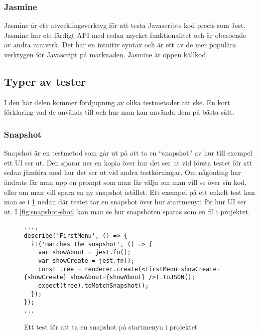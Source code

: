 \subsubsection{Jasmine}
Jasmine är ett utvecklingsverktyg för att testa Javascripts kod precis som Jest. Jasmine har ett färdigt API med redan mycket funktionalitet och är oberoende av andra ramverk. Det har en intuitiv syntax och är ett av de mer populära verktygen för Javascript på marknaden. Jasmine är öppen källkod.

\subsection{Typer av tester}
I den här delen kommer fördjupning av olika testmetoder att ske. En kort förklaring vad de används till och hur man kan använda dem på bästa sätt.

\subsubsection{Snapshot}
Snapshot är en testmetod som går ut på att ta en ``snapshot'' av hur till exempel ett UI ser ut. Den sparar ner en kopia över hur det ser ut vid första testet för att sedan jämföra med hur det ser ut vid andra testkörningar. Om någonting har ändrats får man upp en prompt som man får välja om man vill se över sin kod, eller om man vill spara en ny snapshot istället. Ett exempel på ett enkelt test kan man se i \ref{fig:snapshot-test} nedan där testet tar en snapshot över hur startmenyn för hur UI ser ut. I \ref{fig:snapshot-shot} kan man se hur snapshoten sparas som en fil i projektet.

\lstset{language=JavaScript}
\begin{figure}[h]
  \center
  \begin{minipage}[c]{5cm}
    \begin{lstlisting}
...,
describe('FirstMenu', () => {
  it('matches the snapshot', () => {
    var showAbout = jest.fn();
    var showCreate = jest.fn();
    const tree = renderer.create(<FirstMenu showCreate={showCreate} showAbout={showAbout} />).toJSON();
    expect(tree).toMatchSnapshot();
  });
});
...
    \end{lstlisting}
  \end{minipage}

  \caption{Ett test för att ta en snapshot på startmenyn i projektet}
  \label{fig:snapshot-test}
\end{figure}



